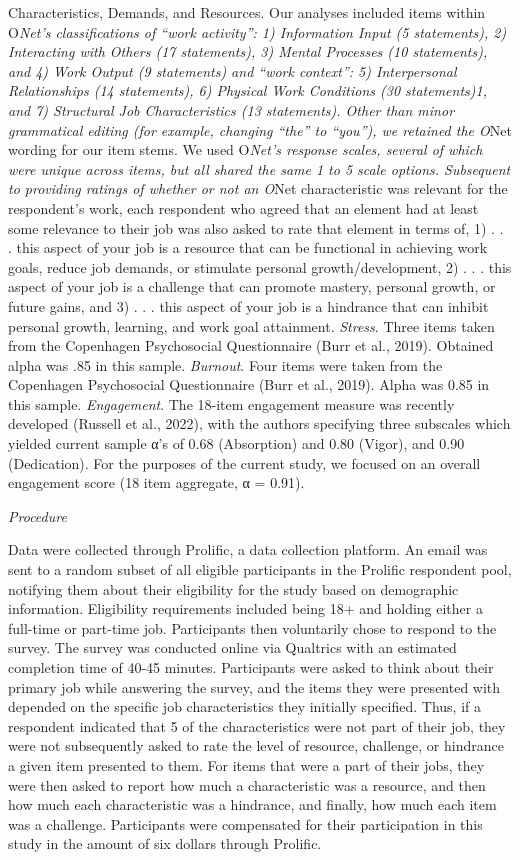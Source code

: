 \documentclass[
  man]{apa6}
\begin{document}
Characteristics, Demands, and Resources. Our analyses included items within O\emph{Net's classifications of ``work activity'': 1) Information Input (5 statements), 2) Interacting with Others (17 statements), 3) Mental Processes (10 statements), and 4) Work Output (9 statements) and ``work context'': 5) Interpersonal Relationships (14 statements), 6) Physical Work Conditions (30 statements)1, and 7) Structural Job Characteristics (13 statements).
Other than minor grammatical editing (for example, changing ``the'' to ``you''), we retained the O}Net wording for our item stems. We used O\emph{Net's response scales, several of which were unique across items, but all shared the same 1 to 5 scale options. Subsequent to providing ratings of whether or not an O}Net characteristic was relevant for the respondent's work, each respondent who agreed that an element had at least some relevance to their job was also asked to rate that element in terms of, 1) . . . this aspect of your job is a resource that can be functional in achieving work goals, reduce job demands, or stimulate personal growth/development, 2) . . . this aspect of your job is a challenge that can promote mastery, personal growth, or future gains, and 3) . . . this aspect of your job is a hindrance that can inhibit personal growth, learning, and work goal attainment.
\emph{Stress}. Three items taken from the Copenhagen Psychosocial Questionnaire (Burr et al., 2019). Obtained alpha was .85 in this sample.
\emph{Burnout}. Four items were taken from the Copenhagen Psychosocial Questionnaire (Burr et al., 2019). Alpha was 0.85 in this sample.
\emph{Engagement}. The 18-item engagement measure was recently developed (Russell et al., 2022), with the authors specifying three subscales which yielded current sample α's of 0.68 (Absorption) and 0.80 (Vigor), and 0.90 (Dedication). For the purposes of the current study, we focused on an overall engagement score (18 item aggregate, α = 0.91).

\emph{Procedure}

Data were collected through Prolific, a data collection platform. An email was sent to a random subset of all eligible participants in the Prolific respondent pool, notifying them about their eligibility for the study based on demographic information. Eligibility requirements included being 18+ and holding either a full-time or part-time job. Participants then voluntarily chose to respond to the survey. The survey was conducted online via Qualtrics with an estimated completion time of 40-45 minutes. Participants were asked to think about their primary job while answering the survey, and the items they were presented with depended on the specific job characteristics they initially specified. Thus, if a respondent indicated that 5 of the characteristics were not part of their job, they were not subsequently asked to rate the level of resource, challenge, or hindrance a given item presented to them. For items that were a part of their jobs, they were then asked to report how much a characteristic was a resource, and then how much each characteristic was a hindrance, and finally, how much each item was a challenge. Participants were compensated for their participation in this study in the amount of six dollars through Prolific.
\end{document}
